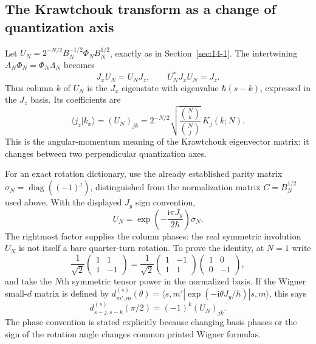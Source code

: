 \subsection{The Krawtchouk transform as a change of quantization axis}
Let $U_N=2^{-N/2}B_N^{-1/2}\Phi_NB_N^{1/2}$, exactly as in Section~\ref{sec:14-1}. The intertwining $A_N\Phi_N=\Phi_N\Lambda_N$ becomes
\begin{equation}\label{eq:angular-U-intertwining}
J_xU_N=U_NJ_z,\qquad U_N^*J_xU_N=J_z.
\end{equation}
Thus column $k$ of $U_N$ is the $J_x$ eigenstate with eigenvalue $\hbar(s-k)$, expressed in the $J_z$ basis. Its coefficients are
\[
\langle j_z|k_x\rangle=(U_N)_{jk}
=2^{-N/2}\sqrt{\frac{\binom Nk}{\binom Nj}}\,K_j(k;N).
\]
This is the angular-momentum meaning of the Krawtchouk eigenvector matrix: it changes between two perpendicular quantization axes.

For an exact rotation dictionary, use the already established parity matrix $\sigma_N=\operatorname{diag}((-1)^j)$, distinguished from the normalization matrix $C=B_N^{1/2}$ used above. With the displayed $J_y$ sign convention,
\begin{equation}\label{eq:angular-Wigner-d}
U_N=\exp\!\left(-\frac{\mathrm i\pi J_y}{2\hbar}\right)\sigma_N.
\end{equation}
The rightmost factor supplies the column phases: the real symmetric involution $U_N$ is not itself a bare quarter-turn rotation. To prove the identity, at $N=1$ write
\[
\frac1{\sqrt2}\begin{pmatrix}1&1\\1&-1\end{pmatrix}
=\frac1{\sqrt2}\begin{pmatrix}1&-1\\1&1\end{pmatrix}
\begin{pmatrix}1&0\\0&-1\end{pmatrix},
\]
and take the $N$th symmetric tensor power in the normalized basis. If the Wigner small-$d$ matrix is defined by
$d^{(s)}_{m',m}(\theta)=\langle s,m'|\exp(-\mathrm i\theta J_y/\hbar)|s,m\rangle$, this says
\[
d^{(s)}_{s-j,s-k}(\pi/2)=(-1)^k(U_N)_{jk}.
\]
The phase convention is stated explicitly because changing basis phases or the sign of the rotation angle changes common printed Wigner formulas.


